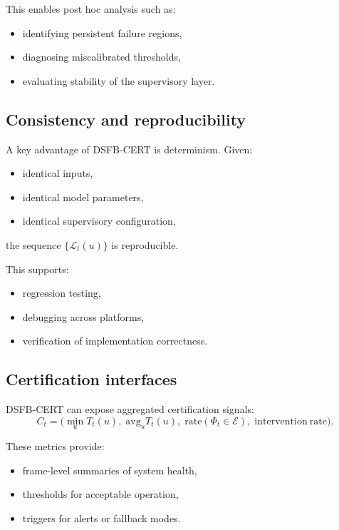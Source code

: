 \documentclass[11pt,letterpaper]{article}
\theoremstyle{gcresult}
\theoremstyle{definition}
\begin{document}
This enables post hoc analysis such as:
\begin{itemize}[leftmargin=1.5em]
    \item identifying persistent failure regions,
    \item diagnosing miscalibrated thresholds,
    \item evaluating stability of the supervisory layer.
\end{itemize}


\subsection{Consistency and reproducibility}

A key advantage of DSFB-CERT is determinism. Given:
\begin{itemize}[leftmargin=1.5em]
    \item identical inputs,
    \item identical model parameters,
    \item identical supervisory configuration,
\end{itemize}
the sequence $\{\mathcal{L}_t(u)\}$ is reproducible.

This supports:
\begin{itemize}[leftmargin=1.5em]
    \item regression testing,
    \item debugging across platforms,
    \item verification of implementation correctness.
\end{itemize}


\subsection{Certification interfaces}

DSFB-CERT can expose aggregated certification signals:
\begin{equation}
C_t = \bigl(
\min_u T_t(u),\;
\mathrm{avg}_u T_t(u),\;
\mathrm{rate}(\Phi_t\in\mathcal{E}),\;
\mathrm{intervention\ rate}
\bigr).
\end{equation}

These metrics provide:
\begin{itemize}[leftmargin=1.5em]
    \item frame-level summaries of system health,
    \item thresholds for acceptable operation,
    \item triggers for alerts or fallback modes.
\end{itemize}
\end{document}
